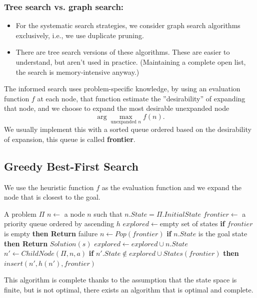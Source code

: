\documentclass[10pt, letterpaper]{report}
\begin{document}
\subsubsection{Tree search vs. graph search:}
\begin{itemize}
    \item For the systematic search strategies, we consider graph search algorithms exclusively, i.e., we use duplicate pruning.
    \item There are tree search versions of these algorithms. These are easier to understand, but aren't used in practice. (Maintaining a complete open list, the search is memory-intensive anyway.)
\end{itemize}
The informed search uses problem-specific knowledge, by using an evaluation function $f$ at each node, that function estimate the ''desirability'' of expanding that node, and we choose to expand the most desirable unexpanded node $$\arg\max_{\text{unexpanded }n} f(n).$$
We usually implement this with a sorted queue ordered based on the desirability of expansion, this queue is called \textbf{frontier}.
\subsection{Greedy Best-First Search}
We use the heuristic function $f$ as the evaluation function and we expand the node that is closest to the goal.
\begin{algorithm}
    \caption{Greedy Best-First Search}\label{alg:greedy-best-first}
    \begin{algorithmic}
    \Require A problem $\Pi$
    \State $n\leftarrow$ a node $n$ such that $n.State=\Pi.InitialState$
    \State $frontier\leftarrow$ a priority queue ordered by ascending $h$
    \State $explored\leftarrow $empty set of states
    \State \textbf{if} $frontier$ is empty \textbf{then Return} failure 
    \State $n\leftarrow Pop(frontier)$
    \State \textbf{if} $n.State$ is the goal state \textbf{then Return} $Solution(s)$
    \State $explored\leftarrow explored \cup n.State$
    \State $n'\leftarrow ChildNode(\Pi,n,a)$
    \State \textbf{if} $n'.State\notin explored \cup States(frontier)$\textbf{ then} $insert(n',h(n'),frontier)$ 
    \EndFor
    \EndWhile
    \end{algorithmic}
\end{algorithm}
This algorithm is complete thanks to the assumption that the state space is finite, but is not optimal, there exists an algorithm that is optimal and complete.
\end{document}
